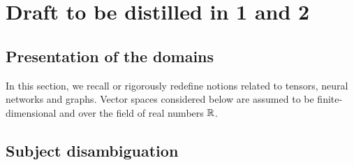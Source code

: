 \setcounter{chapter}{-1}
\chapter{Draft to be distilled in 1 and 2}

\minitoc
\newpage

\section{Presentation of the domains}

In this section, we recall or rigorously redefine notions related to tensors, neural networks and graphs. Vector spaces considered below are assumed to be finite-dimensional and over the field of real numbers $\mathbb{R}$.


\newpage

\newpage

\newpage

\section{Subject disambiguation}


\newpage